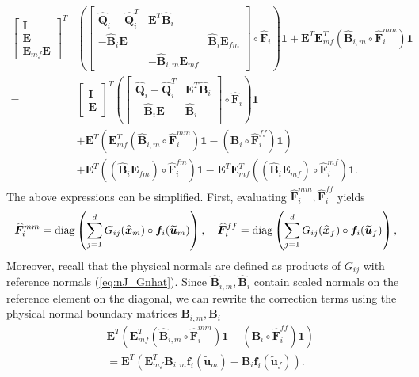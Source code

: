 \documentclass{svjour3}                     %
\renewcommand{\hat}{\widehat}
\renewcommand{\tilde}{\widetilde}
\newcommand{\diag}[1]{{\rm diag}\LRp{#1}}
\newcommand{\LRp}[1]{\left( #1 \right)}
\begin{document}
\begin{align*}
\begin{bmatrix} \bm{I} \\ \bm{E} \\ \bm{E}_{mf}\bm{E} \end{bmatrix}^T
&\LRp{\begin{bmatrix}
\hat{\bm{Q}}_i-\hat{\bm{Q}}_i^T & \bm{E}^T\hat{\bm{B}}_i &\\
-\hat{\bm{B}}_i\bm{E} &  & \hat{\bm{B}}_{i}{\bm{E}}_{fm} \\
& -\hat{\bm{B}}_{i,m}{\bm{E}}_{mf} & 
\end{bmatrix} \circ \hat{\bm{F}}_i}\bm{1} 
+ \bm{E}^T\bm{E}_{mf}^T \LRp{\hat{\bm{B}}_{i,m} \circ \hat{\bm{F}}_i^{mm}}\bm{1} 
\\
=& 
\begin{bmatrix} \bm{I} \\ \bm{E} \end{bmatrix}^T
\LRp{\begin{bmatrix}
\hat{\bm{Q}}_i-\hat{\bm{Q}}_i^T  & \bm{E}^T\hat{\bm{B}}_i\\
-\hat{\bm{B}}_i\bm{E} & \hat{\bm{B}}_i\\
\end{bmatrix} \circ \hat{\bm{F}}_i}\bm{1} \\
&+ \bm{E}^T\LRp{\bm{E}_{mf}^T \LRp{\hat{\bm{B}}_{i,m} \circ \hat{\bm{F}}_i^{mm}}\bm{1} - \LRp{\bm{B}_i\circ \hat{\bm{F}}^{ff}_i}\bm{1} } \\
&+ \bm{E}^T \LRp{\LRp{\hat{\bm{B}}_i\bm{E}_{fm}}\circ \hat{\bm{F}}_i^{fm}}\bm{1} - \bm{E}^T\bm{E}_{mf}^T \LRp{ \LRp{\hat{\bm{B}}_i\bm{E}_{mf}} \circ \hat{\bm{F}}_i^{mf}}\bm{1}.
\end{align*}
The above expressions can be simplified.  First, evaluating $\hat{\bm{F}}_i^{mm},\hat{\bm{F}}_i^{ff}$ yields
\[
\hat{\bm{F}}_i^{mm} = \diag{\sum_{j=1}^d G_{ij}(\hat{\bm{x}}_m) \circ \bm{f}_i(\tilde{\bm{u}}_m)}, 
\quad 
\hat{\bm{F}}_i^{ff} = \diag{\sum_{j=1}^d G_{ij}(\hat{\bm{x}}_f) \circ \bm{f}_i(\tilde{\bm{u}}_f)},
\]
Moreover, recall that the physical normals are defined as products of $G_{ij}$ with reference normals (\ref{eq:nJ_Gnhat}).  Since $\hat{\bm{B}}_{i,m}, \hat{\bm{B}}_{i}$ contain scaled normals on the reference element on the diagonal, we can rewrite the correction terms using the physical normal boundary matrices $\bm{B}_{i,m}, \bm{B}_i$
\begin{align*}
&\bm{E}^T\LRp{\bm{E}_{mf}^T \LRp{\hat{\bm{B}}_{i,m} \circ \hat{\bm{F}}_i^{mm}}\bm{1} - \LRp{\bm{B}_i\circ \hat{\bm{F}}^{ff}_i}\bm{1} } \\
&= \bm{E}^T\LRp{\bm{E}_{mf}^T \bm{B}_{i,m}\bm{f}_i(\tilde{\bm{u}}_m) - \bm{B}_{i}\bm{f}_i(\tilde{\bm{u}}_f) }.
\end{align*}
\end{document}
